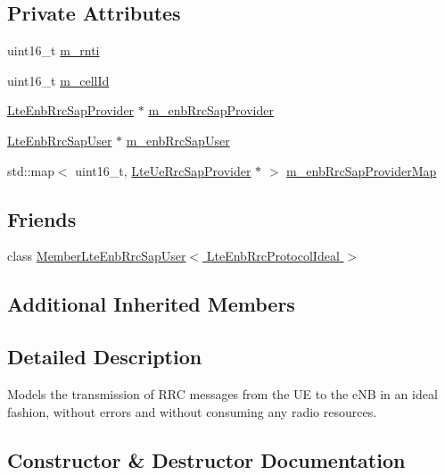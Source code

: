 \subsection*{Private Attributes}
\begin{DoxyCompactItemize}
\item 
uint16\+\_\+t \hyperlink{classns3_1_1LteEnbRrcProtocolIdeal_aaedd79c348aa54b9a6a4b28944e97638}{m\+\_\+rnti}
\item 
uint16\+\_\+t \hyperlink{classns3_1_1LteEnbRrcProtocolIdeal_af9f173a13b052d0d1a7c4ee014ae3873}{m\+\_\+cell\+Id}
\item 
\hyperlink{classns3_1_1LteEnbRrcSapProvider}{Lte\+Enb\+Rrc\+Sap\+Provider} $\ast$ \hyperlink{classns3_1_1LteEnbRrcProtocolIdeal_a3026cd9d0294eb553394674fa5facd38}{m\+\_\+enb\+Rrc\+Sap\+Provider}
\item 
\hyperlink{classns3_1_1LteEnbRrcSapUser}{Lte\+Enb\+Rrc\+Sap\+User} $\ast$ \hyperlink{classns3_1_1LteEnbRrcProtocolIdeal_a57a635e916167b82a7146bf91dd8af60}{m\+\_\+enb\+Rrc\+Sap\+User}
\item 
std\+::map$<$ uint16\+\_\+t, \hyperlink{classns3_1_1LteUeRrcSapProvider}{Lte\+Ue\+Rrc\+Sap\+Provider} $\ast$ $>$ \hyperlink{classns3_1_1LteEnbRrcProtocolIdeal_a77d0bd25d54009ce65f00acf765dd714}{m\+\_\+enb\+Rrc\+Sap\+Provider\+Map}
\end{DoxyCompactItemize}
\subsection*{Friends}
\begin{DoxyCompactItemize}
\item 
class \hyperlink{classns3_1_1LteEnbRrcProtocolIdeal_a9b690ba5286f0e34aa5260e0da4a9e46}{Member\+Lte\+Enb\+Rrc\+Sap\+User$<$ Lte\+Enb\+Rrc\+Protocol\+Ideal $>$}
\end{DoxyCompactItemize}
\subsection*{Additional Inherited Members}


\subsection{Detailed Description}
Models the transmission of R\+RC messages from the UE to the e\+NB in an ideal fashion, without errors and without consuming any radio resources. 

\subsection{Constructor \& Destructor Documentation}
